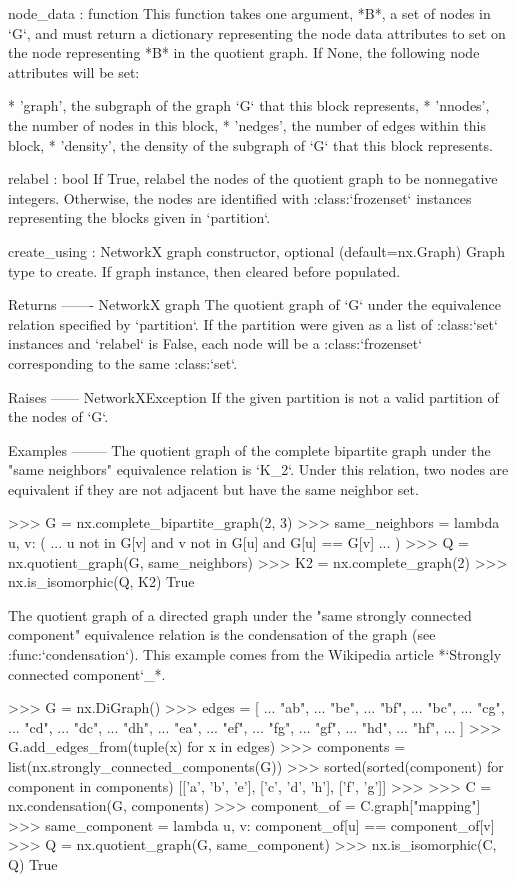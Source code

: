 \begin{DoxyVerb}
node_data : function
    This function takes one argument, *B*, a set of nodes in `G`,
    and must return a dictionary representing the node data
    attributes to set on the node representing *B* in the quotient graph.
    If None, the following node attributes will be set:

    * 'graph', the subgraph of the graph `G` that this block
      represents,
    * 'nnodes', the number of nodes in this block,
    * 'nedges', the number of edges within this block,
    * 'density', the density of the subgraph of `G` that this
      block represents.

relabel : bool
    If True, relabel the nodes of the quotient graph to be
    nonnegative integers. Otherwise, the nodes are identified with
    :class:`frozenset` instances representing the blocks given in
    `partition`.

create_using : NetworkX graph constructor, optional (default=nx.Graph)
   Graph type to create. If graph instance, then cleared before populated.

Returns
-------
NetworkX graph
    The quotient graph of `G` under the equivalence relation
    specified by `partition`. If the partition were given as a
    list of :class:`set` instances and `relabel` is False,
    each node will be a :class:`frozenset` corresponding to the same
    :class:`set`.

Raises
------
NetworkXException
    If the given partition is not a valid partition of the nodes of
    `G`.

Examples
--------
The quotient graph of the complete bipartite graph under the "same
neighbors" equivalence relation is `K_2`. Under this relation, two nodes
are equivalent if they are not adjacent but have the same neighbor set.

>>> G = nx.complete_bipartite_graph(2, 3)
>>> same_neighbors = lambda u, v: (
...     u not in G[v] and v not in G[u] and G[u] == G[v]
... )
>>> Q = nx.quotient_graph(G, same_neighbors)
>>> K2 = nx.complete_graph(2)
>>> nx.is_isomorphic(Q, K2)
True

The quotient graph of a directed graph under the "same strongly connected
component" equivalence relation is the condensation of the graph (see
:func:`condensation`). This example comes from the Wikipedia article
*`Strongly connected component`_*.

>>> G = nx.DiGraph()
>>> edges = [
...     "ab",
...     "be",
...     "bf",
...     "bc",
...     "cg",
...     "cd",
...     "dc",
...     "dh",
...     "ea",
...     "ef",
...     "fg",
...     "gf",
...     "hd",
...     "hf",
... ]
>>> G.add_edges_from(tuple(x) for x in edges)
>>> components = list(nx.strongly_connected_components(G))
>>> sorted(sorted(component) for component in components)
[['a', 'b', 'e'], ['c', 'd', 'h'], ['f', 'g']]
>>>
>>> C = nx.condensation(G, components)
>>> component_of = C.graph["mapping"]
>>> same_component = lambda u, v: component_of[u] == component_of[v]
>>> Q = nx.quotient_graph(G, same_component)
>>> nx.is_isomorphic(C, Q)
True


\end{DoxyVerb}
